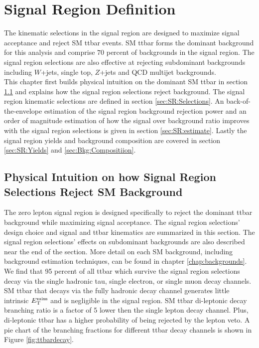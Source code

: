
\chapter{Signal Region Definition}
\label{chap:SignalRegion}

\indent The kinematic selections in the signal region are designed to maximize signal acceptance and reject SM ttbar events.  SM ttbar forms the dominant background for this analysis and comprise $70$ percent of backgrounds in the signal region.  The signal region selections are also effective at rejecting subdominant backgrounds including $W$+jets, single top, $Z$+jets and QCD multijet backgrounds.  \\

\indent This chapter first builds physical intuition on the dominant SM ttbar in section \ref{sec:SR:physical} and explains how the signal region selections reject background.  The signal region kinematic selections are defined in section \ref{sec:SR:Selections}.  An back-of-the-envelope estimation of the signal region background rejection power and an order of magnitude estimation of how the signal over background ratio improves with the signal region selections is given in section \ref{sec:SR:estimate}. Lastly the signal region yields and background composition are covered in section \ref{sec:SR:Yields} and \ref{sec:Bkg:Compositiion}.  \\

\section{Physical Intuition on how Signal Region Selections Reject SM Background}
\label{sec:SR:physical}

\indent The zero lepton signal region is designed specifically to reject the dominant ttbar background while maximizing signal acceptance.  The signal region selections' design choice and signal and ttbar kinematics are summarized in this section.  The signal region selections' effects on subdominant backgrounds are also described near the end of the section. More detail on each SM background, including background estimation techniques, can be found in chapter \ref{chap:backgrounds}. \\

\indent  We find that 95 percent of all ttbar which survive the signal region selections decay via the single hadronic tau, single electron, or single muon decay channels.  SM ttbar that decays via the fully hadronic decay channel generates little intrinsic $E_{\mathrm{T}}^{\mathrm{miss}}$ and is negligible in the signal region.  SM ttbar di-leptonic decay branching ratio is a factor of 5 lower then the single lepton decay channel. Plus, di-leptonic ttbar has a higher probability of being rejected by the lepton veto.  A pie chart of the branching fractions for different ttbar decay channels is shown in Figure \ref{fig:ttbardecay}. \\

